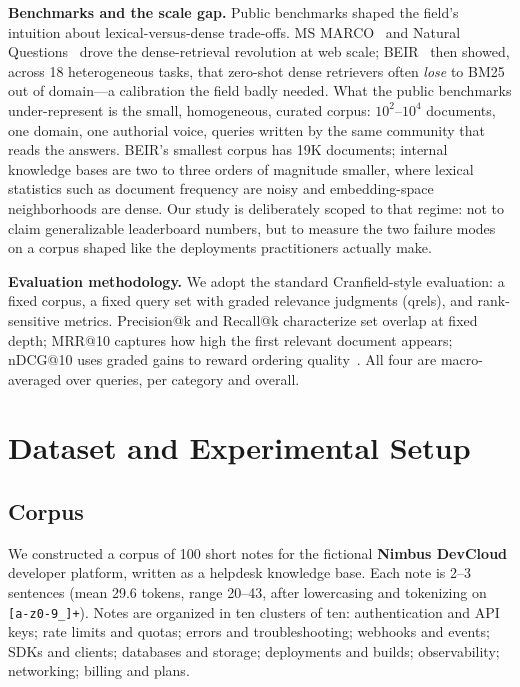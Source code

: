 \documentclass[11pt,a4paper]{article}
\newcommand{\code}[1]{\texttt{#1}}
\begin{document}
\textbf{Benchmarks and the scale gap.} Public benchmarks shaped the field's intuition about lexical-versus-dense trade-offs. MS MARCO~\cite{bajaj2016} and Natural Questions~\cite{kwiatkowski2019} drove the dense-retrieval revolution at web scale; BEIR~\cite{thakur2021} then showed, across 18 heterogeneous tasks, that zero-shot dense retrievers often \emph{lose} to BM25 out of domain---a calibration the field badly needed. What the public benchmarks under-represent is the small, homogeneous, curated corpus: $10^2$--$10^4$ documents, one domain, one authorial voice, queries written by the same community that reads the answers. BEIR's smallest corpus has 19K documents; internal knowledge bases are two to three orders of magnitude smaller, where lexical statistics such as document frequency are noisy and embedding-space neighborhoods are dense. Our study is deliberately scoped to that regime: not to claim generalizable leaderboard numbers, but to measure the two failure modes on a corpus shaped like the deployments practitioners actually make.

\textbf{Evaluation methodology.} We adopt the standard Cranfield-style evaluation: a fixed corpus, a fixed query set with graded relevance judgments (qrels), and rank-sensitive metrics. Precision@k and Recall@k characterize set overlap at fixed depth; MRR@10 captures how high the first relevant document appears; nDCG@10 uses graded gains to reward ordering quality~\cite{manning2008}. All four are macro-averaged over queries, per category and overall.

\section{Dataset and Experimental Setup}\label{sec:setup}

\subsection{Corpus}

We constructed a corpus of 100 short notes for the fictional \textbf{Nimbus DevCloud} developer platform, written as a helpdesk knowledge base. Each note is 2--3 sentences (mean 29.6 tokens, range 20--43, after lowercasing and tokenizing on \code{[a-z0-9\_]+}). Notes are organized in ten clusters of ten: authentication and API keys; rate limits and quotas; errors and troubleshooting; webhooks and events; SDKs and clients; databases and storage; deployments and builds; observability; networking; billing and plans.
\end{document}
